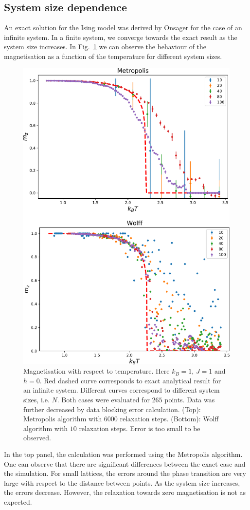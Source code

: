 \documentclass[pra,aps,superscriptaddress,amssymb,amsmath,reprint,noeprint,floatfix]{revtex4-2}
\begin{document}
\subsection{\label{subsec:systemsizedependence}System size dependence}
An exact solution for the Ising model was derived by Onsager \cite{PhysRev.65.117} for the case of an infinite system. In a finite system, we converge towards the exact result as the system size increases. In Fig.\ \ref{fig:size_dep} we can observe the behaviour of the magnetisation as a function of the temperature for different system sizes. 

\begin{figure}[H]
    \centering
    \includegraphics[width=0.8\linewidth]{Figures/size_dependence.pdf}
    \caption{Magnetisation with respect to temperature. Here $k_B=1$, $J=1$ and $h=0$. Red dashed curve corresponds to exact analytical result for an infinite system. Different curves correspond to different system sizes, i.e. $N$. Both cases were evaluated for $265$ points. Data was further decreased by data blocking error calculation. (Top): Metropolis algorithm with $6000$ relaxation steps. (Bottom): Wolff algorithm with $10$ relaxation steps. Error is too small to be observed.}
    \label{fig:size_dep}
\end{figure}
In the top panel, the calculation was performed using the Metropolis algorithm. One can observe that there are significant differences between the exact case and the simulation. For small lattices, the errors around the phase transition are very large with respect to the distance between points. As the system size increases, the errors decrease. However, the relaxation towards zero magnetisation is not as expected.
\end{document}
